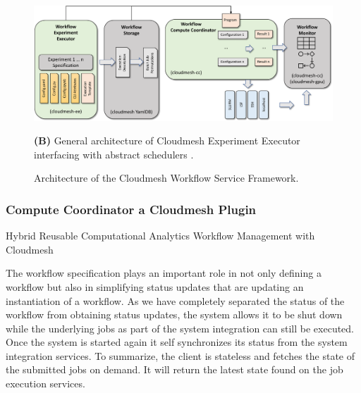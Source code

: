 \documentclass[utf8]{FrontiersinVancouver} %
\begin{document}
\begin{figure}[htb]
{    \centering\includegraphics[width=1.0\columnwidth]{images/cloudmesh-ee-new}
    
    
    {\bf (B)} General architecture of Cloudmesh Experiment Executor interfacing with abstract schedulers \citep{las-frontiers-edu}.
  }

  
  
    \caption{Architecture of the Cloudmesh Workflow Service Framework.}
    \label{fig:cc-2}

\end{figure}
 


\subsubsection{Compute Coordinator a Cloudmesh Plugin}

Hybrid Reusable Computational Analytics Workflow
Management with Cloudmesh

\citep{las-2022-hybrid}
\citep{las-2022-templated}


The workflow specification plays an important role in not only
defining a workflow but also in simplifying status updates that are
updating an instantiation of a workflow. As we have completely
separated the status of the workflow from obtaining status updates,
the system allows it to be shut down while the underlying jobs as part
of the system integration can still be executed. Once the system is
started again it self synchronizes its status from the system
integration services. To summarize, the client is stateless and
fetches the state of the submitted jobs on demand. It will return the
latest state found on the job execution services.
\end{document}
